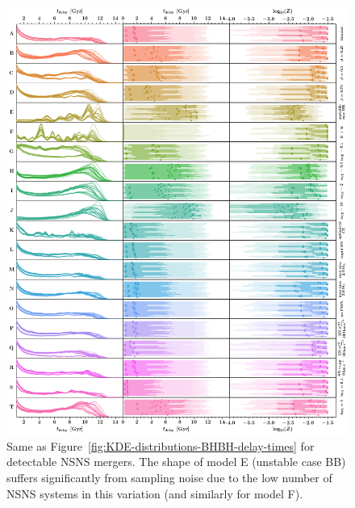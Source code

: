 \documentclass[fleqn,usenatbib]{mnras}
\begin{document}
\begin{figure}
    \centering
\includegraphics[width=1\textwidth]{figures/KDEplot_time_metallicity_det_BNS.png} %
\caption{Same as Figure~\ref{fig:KDE-distributions-BHBH-delay-times} for detectable \ac{NSNS} mergers. The shape of model E (unstable case BB) suffers significantly from sampling noise due to the low number of NSNS systems in this variation (and similarly for model F). \href{https://github.com/FloorBroekgaarden/Double-Compact-Object-Mergers/blob/main/plottingCode/Fig_7_and_Fig_8_and_Fig_9/KDEplot_time_metallicity_det_BNS.png}{\faFileImage} \href{https://github.com/FloorBroekgaarden/Double-Compact-Object-Mergers/blob/main/plottingCode/Fig_7_and_Fig_8_and_Fig_9/make_Fig_7_and_Fig_8_and_Fig_9.ipynb}{\faBook}}
    \label{fig:KDE-distributions-NSNS-delay-times}
\end{figure}
\end{document}
